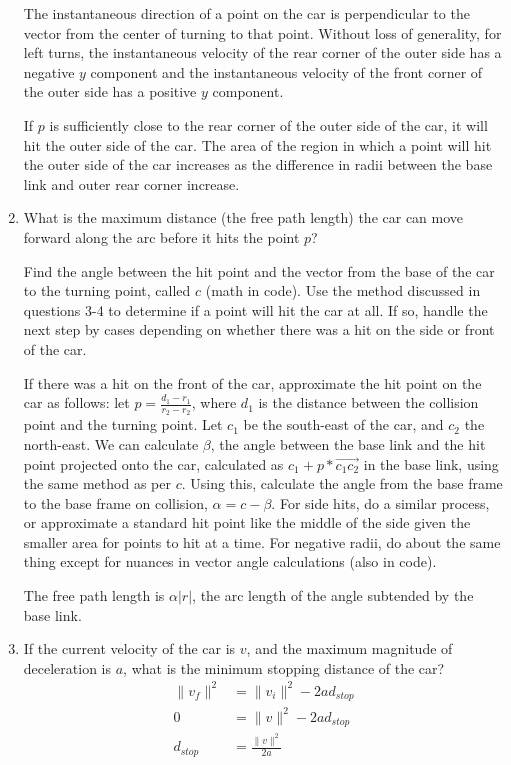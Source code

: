 \documentclass[11pt]{article}
\begin{document}
\begin{enumerate}[leftmargin=*]
    The instantaneous direction of a point on the car is perpendicular to the
    vector from the center of turning to that point. Without loss of generality,
    for left turns, the instantaneous velocity of the rear corner of the outer
    side has a negative $y$ component and the instantaneous velocity of the
    front corner of the outer side has a positive $y$ component.

    If $p$ is sufficiently close to the rear corner of the outer side of the
    car, it will hit the outer side of the car. The area of the region in which
    a point will hit the outer side of the car increases as the difference in
    radii between the base link and outer rear corner increase.


    \item
    What is the maximum distance (the free path length) the car can move forward
    along the arc before it hits the point $p$?

    Find the angle between the hit point and the vector from the base of the car to
    the turning point, called $c$ (math in code). Use the method discussed in
    questions 3-4 to determine if a point will hit the car at all. If so, handle the
    next step by cases depending on whether there was a hit on the side or front of
    the car.

    If there was a hit on the front of the car, approximate the hit point on the
    car as follows: let $p = \frac{d_1 - r_1}{r_2 - r_2}$, where $d_1$ is the
    distance between the collision point and the turning point. Let $c_1$ be the
    south-east of the car, and $c_2$ the north-east. We can calculate $\beta$,
    the angle between the base link and the hit point projected onto the car,
    calculated as $c_1 + p * \vec{c_1 c_2}$  in the base link, using the same
    method as per $c$. Using this, calculate the angle from the base frame to
    the base frame on collision, $\alpha = c - \beta$.     For side hits, do a
    similar process, or approximate a standard hit point like the middle of the
    side given the smaller area for points to hit at a time. For negative radii,
    do about the same thing except for nuances in vector angle calculations
    (also in code).

    The free path length is $\alpha \lvert r \rvert$, the arc length of the
    angle subtended by the base link.

    \item
    If the current velocity of the car is $v$, and the maximum magnitude of
    deceleration is $a$, what is the minimum stopping distance of the car?
    \begin{align*}
        \lVert v_f \rVert^2 &= \lVert v_i \rVert^2 - 2ad_{stop} \\
        0 &= \lVert v \rVert^2 - 2 a d_{stop} \\
        d_{stop} &= \frac{\lVert v \rVert^2}{2a}
    \end{align*}
\end{enumerate}
\end{document}
